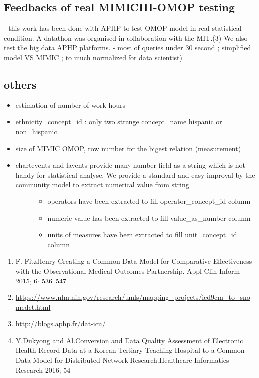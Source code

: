 \subsection{Feedbacks of real MIMICIII-OMOP
testing}\label{feedbacks-of-real-mimiciii-omop-testing}

- this work has been done with APHP to test OMOP model in real
statistical condition. A datathon was organised in collaboration with
the MIT.(3) We also test the big data APHP platforms. - most of queries
under 30 second ; simplified model VS MIMIC ; to much normalized for
data scientist)

\subsection{others}\label{others}

\begin{itemize}
\item
  estimation of number of work hours
\item
  ethnicity\_concept\_id : only two strange concept\_name hispanic or
  non\_hispanic
\item
  size of MIMIC OMOP, row number for the bigest relation (measurement)
\item
  \begin{description}
  \item[chartevents and lavents provide many number field as a string
  which is not handy for statistical analyse. We provide a standard and
  easy improval by the community model to extract numerical value from
  string]
  \begin{itemize}
  \tightlist
  \item
    operators have been extracted to fill operator\_concept\_id column
  \item
    numeric value has been extracted to fill value\_as\_number column
  \item
    units of measures have been extracted to fill unit\_concept\_id
    column
  \end{itemize}
  \end{description}
\end{itemize}

\begin{enumerate}
\def\labelenumi{\arabic{enumi}.}
\tightlist
\item
  F. FitzHenry Creating a Common Data Model for Comparative
  Effectiveness with the Observational Medical Outcomes Partnership.
  Appl Clin Inform 2015; 6: 536--547
\item
  \url{https://www.nlm.nih.gov/research/umls/mapping_projects/icd9cm_to_snomedct.html}
\item
  \url{http://blogs.aphp.fr/dat-icu/}
\item
  Y.Dukyong and Al.Conversion and Data Quality Assessment of Electronic
  Health Record Data at a Korean Tertiary Teaching Hospital to a Common
  Data Model for Distributed Network Research.Healthcare Informatics
  Research 2016; 54
\end{enumerate}


